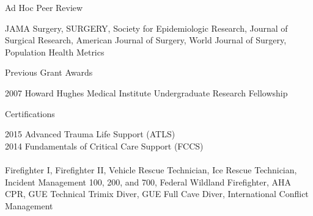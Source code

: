\documentclass{resume} %
\begin{document}
   
   
   \begin{rSection}{Ad Hoc Peer Review}
 
   JAMA Surgery, SURGERY, Society for Epidemiologic Research, Journal of Surgical Research, American Journal of Surgery, World Journal of Surgery, Population Health Metrics
  
   
   \end{rSection}
   
 
   
   \begin{rSection}{Previous Grant Awards}
  
   2007 \enspace Howard Hughes Medical Institute Undergraduate Research Fellowship 
   
   
   \end{rSection}
   
   
   \begin{rSection}{Certifications}
  
   2015 \enspace Advanced Trauma Life Support (ATLS)\\
   2014 \enspace Fundamentals of Critical Care Support (FCCS) \\
   \\
   Firefighter I, Firefighter II, Vehicle Rescue Technician, Ice Rescue Technician, 
   Incident Management 100, 200, and 700, Federal Wildland Firefighter, AHA CPR,
   GUE Technical Trimix Diver, GUE Full Cave Diver, International Conflict Management
   
   
   \end{rSection}
   

\end{document}
